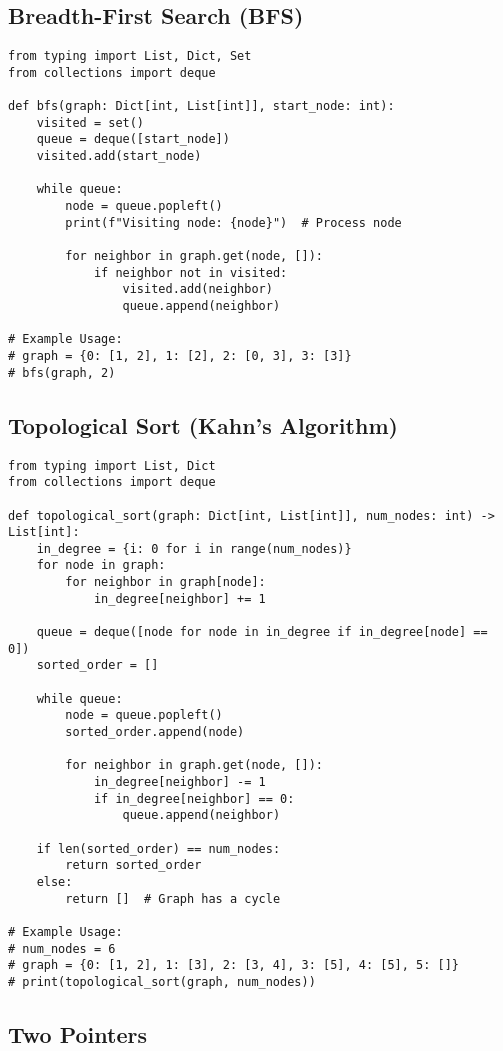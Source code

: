 \documentclass[11pt, a4paper]{article}
\begin{document}
\subsection{Breadth-First Search (BFS)}
\begin{verbatim}
from typing import List, Dict, Set
from collections import deque

def bfs(graph: Dict[int, List[int]], start_node: int):
    visited = set()
    queue = deque([start_node])
    visited.add(start_node)

    while queue:
        node = queue.popleft()
        print(f"Visiting node: {node}")  # Process node

        for neighbor in graph.get(node, []):
            if neighbor not in visited:
                visited.add(neighbor)
                queue.append(neighbor)

# Example Usage:
# graph = {0: [1, 2], 1: [2], 2: [0, 3], 3: [3]}
# bfs(graph, 2)
\end{verbatim}

\subsection{Topological Sort (Kahn's Algorithm)}
\begin{verbatim}
from typing import List, Dict
from collections import deque

def topological_sort(graph: Dict[int, List[int]], num_nodes: int) -> List[int]:
    in_degree = {i: 0 for i in range(num_nodes)}
    for node in graph:
        for neighbor in graph[node]:
            in_degree[neighbor] += 1

    queue = deque([node for node in in_degree if in_degree[node] == 0])
    sorted_order = []

    while queue:
        node = queue.popleft()
        sorted_order.append(node)

        for neighbor in graph.get(node, []):
            in_degree[neighbor] -= 1
            if in_degree[neighbor] == 0:
                queue.append(neighbor)

    if len(sorted_order) == num_nodes:
        return sorted_order
    else:
        return []  # Graph has a cycle

# Example Usage:
# num_nodes = 6
# graph = {0: [1, 2], 1: [3], 2: [3, 4], 3: [5], 4: [5], 5: []}
# print(topological_sort(graph, num_nodes))
\end{verbatim}

\subsection{Two Pointers}
\end{document}
